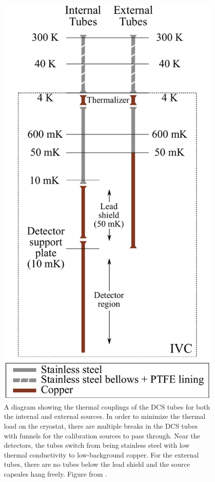 \begin{figure}[htbp]
    \centering
    \includegraphics[height=0.4\paperheight]{Figures/thermal_coupling.pdf}
    \caption[A diagram showing the thermal couplings of the DCS tubes for both the internal and external sources.]
    {A diagram showing the thermal couplings of the DCS tubes for both the internal and external sources.
    In order to minimize the thermal load on the cryostat, there are multiple breaks in the DCS tubes with funnels for the calibration sources to pass through.
    Near the detectors, the tubes switch from being stainless steel with low thermal conductivity to low-background copper.
    For the external tubes, there are no tubes below the lead shield and the source capsules hang freely.
    Figure from \cite{Cushman:2016cnv}.}
    \label{fig:dcs_thermal_coupling}
\end{figure}

